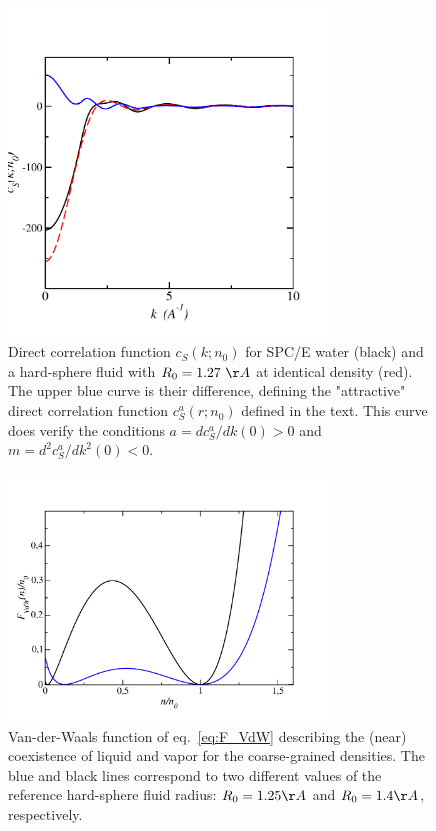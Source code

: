\documentclass[aip,jcp,preprint]{revtex4-1}
\begin{document}
\begin{figure}
    \includegraphics[width=8.5cm]{cS_of_k_spc_PY_127.pdf}
    \caption{Direct correlation function $c_S(k;n_0)$ for SPC/E water (black) and a hard-sphere fluid with $R_0= 1.27~\AA$ at identical density (red). The upper blue curve is their difference, defining the "attractive" direct correlation function $c_S^a(r;n_0)$ defined   in the text. This curve does verify the conditions $a=dc_S^a/dk(0)  >0$ and $m = d^2c_S^a/dk^2(0) < 0$.
        \label{fig:ck_spc}
        }
\end{figure}

\begin{figure}
    \includegraphics[width=8.5cm]{F_VdW_R=125_R=14.pdf}
    \caption{Van-der-Waals function of eq.~\ref{eq:F_VdW} describing  the (near) coexistence of liquid and vapor for the coarse-grained densities. The blue and black lines correspond to two different values of the reference hard-sphere fluid radius:  $R_0 = 1.25 \AA$ and $R_0 = 1.4 \AA$, respectively.
        \label{fig:fn}
        }
\end{figure}
\end{document}
